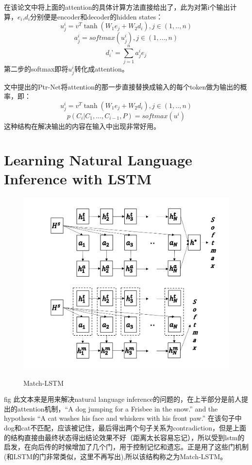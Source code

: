 \documentclass[UTF8]{article}
\begin{document}
在该论文中将上面的attention的具体计算方法直接给出了，此为对第i个输出计算，$e_i$,$d_i$分别便是encoder和decoder的hidden states：
$$u_j^i=v^T\tanh(W_1e_j+W_2d_i) , j\in(1,..,n)$$
$$a_j^i=softmax(u_j^i),j\in(1,...,n)$$
$$d_i’=\sum_{j=1}^na_j^ie_j$$
第二步的softmax即将$u_j^i$转化成attention。

文中提出的Ptr-Net将attention的那一步直接替换成输入的每个token做为输出的概率，即：
$$u_j^i=v^T\tanh(W_1e_j+W_2d_i) , j\in(1,..,n)$$
$$p(C_i|C_1,...,C_{i-1},P)=softmax(u^i)$$
这种结构在解决输出的内容在输入中出现非常好用。

\section{Learning Natural Language Inference with LSTM}

\begin{figure}[htpb]
    \centering
    \includegraphics[width=0.7\linewidth]{Match-LSTM.png}
    \label{fig:Match-LSTM}
    \caption{Match-LSTM}
\end{figure}
fig
此文本来是用来解决natural language inference的问题的，在上半部分是前人提出的attention机制，“A dog jumping for a Frisbee in the snow.” and the hypothesis “A cat washes his face and whiskers with his front paw.” 在该句子中dog和cat不匹配，应该被记住，最后得出两个句子关系为contradiction，但是上面的结构直接由最终状态得出结论效果不好（距离太长容易忘记），所以受到lstm的启发，在向后传的时候增加了几个门，用于控制记忆和遗忘。正是用了这些门机制(和LSTM的门非常类似，这里不再写出),所以该结构称之为Match-LSTM。
\end{document}
